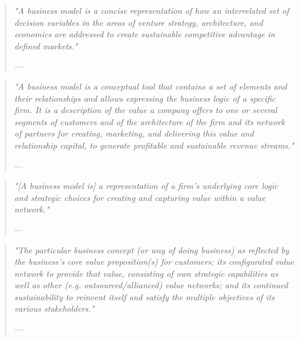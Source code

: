 \begin{quote}{\slshape 
"A business model is a concise representation of how an interrelated set of decision variables in the areas of venture strategy, architecture, and economics are addressed to create sustainable competitive advantage in defined markets."}
\vspace*{-5pt}
\begin{flushright}
	--- \citet[p. 727]{Morris2005}
\end{flushright}
\end{quote}

\begin{quote}{\slshape 
"A business model is a conceptual tool that contains a set of elements and their relationships and allows expressing the business logic of a specific firm. It is a description of the value a company offers to one or several segments of customers and of the architecture of the firm and its network of partners for creating, marketing, and delivering this value and relationship capital, to generate profitable and sustainable revenue streams."}
\vspace*{-5pt}
\begin{flushright}
	--- \citet[p. 10]{Osterwalder2005}
\end{flushright}
\end{quote}
	
\begin{quote}{\slshape 
"[A business model is] a representation of a firm's underlying core logic and strategic choices for creating and capturing value within a value network."}
\vspace*{-5pt}
\begin{flushright}
	--- \citet[p. 202]{Shafer2005}
\end{flushright}
\end{quote}

\begin{quote}{\slshape 
"The particular business concept (or way of doing business) as reflected by the business's core value proposition(s) for customers; its configurated value network to provide that value, consisting of own strategic capabilities as well as other (e.g. outsourced/allianced) value networks; and its continued sustainability to reinvent itself and satisfy the multiple objectives of its various stakeholders."}
\vspace*{-5pt}
\begin{flushright}
	--- \citet[p. 40]{Voelpel2005}
\end{flushright}
\end{quote}

